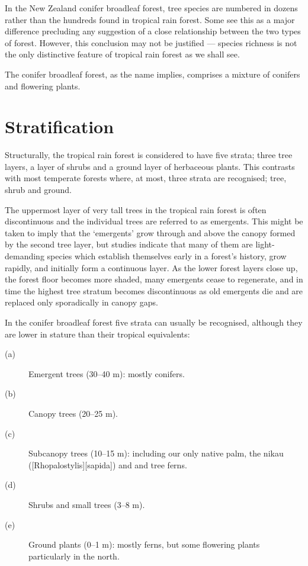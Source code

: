 In the New Zealand conifer broadleaf forest, tree species are numbered in dozens rather than the hundreds found in tropical rain forest.
Some see this as a major difference precluding any suggestion of a close relationship between the two types of forest.
However, this conclusion may not be justified --- species richness is not the only distinctive feature of tropical rain forest as we shall see.

The conifer broadleaf forest, as the name implies, comprises a mixture of conifers and flowering plants.

\section{Stratification}

Structurally, the tropical rain forest is considered to have five strata; three tree layers, a layer of shrubs and a ground layer of herbaceous plants.
This contrasts with most temperate forests where, at most, three strata are recognised; tree, shrub and ground.

The uppermost layer of very tall trees in the tropical rain forest is often discontinuous and the individual trees are referred to as emergents.
This might be taken to imply that the `emergents' grow through and above the canopy formed by the second tree layer, but studies indicate that many of them are light-demanding species which establish themselves early in a forest's history, grow rapidly, and initially form a continuous layer.
As the lower forest layers close up, the forest floor becomes more shaded, many emergents cease to regenerate, and in time the highest tree stratum becomes discontinuous as old emergents die and are replaced only sporadically in canopy gaps.

In the conifer broadleaf forest five strata can usually be recognised, although they are lower in stature than their tropical equivalents:
\begin{description}
\item[{(a)}]Emergent trees (30--40 m): mostly conifers.
\item[{(b)}]Canopy trees (20--25 m).
\item[{(c)}]Subcanopy trees (10--15 m): including our only native palm, the nikau ([Rhopalostylis][sapida]) and  and  tree ferns.
\item[{(d)}]Shrubs and small trees (3--8 m).
\item[{(e)}]Ground plants (0--1 m): mostly ferns, but some flowering plants particularly in the north.
\end{description}
